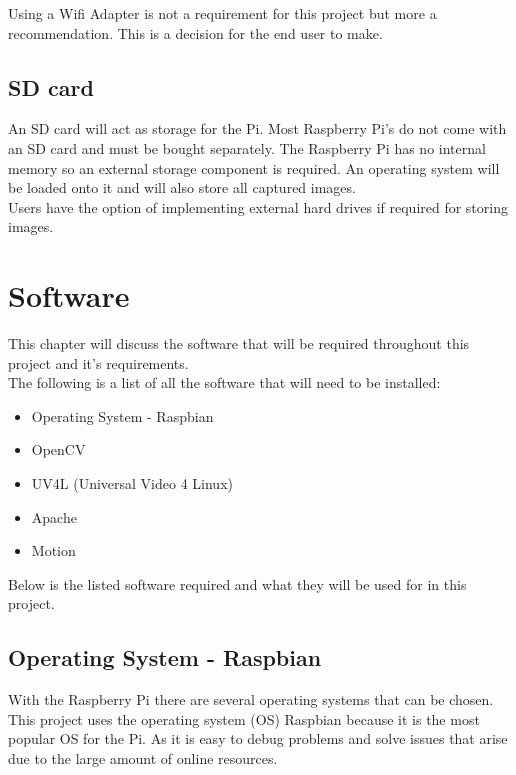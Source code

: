 \documentclass[12pt]{report}
\begin{document}
Using a Wifi Adapter is not a requirement for this project but  more a recommendation. This is a decision for the end user to make.\\

\noindent
\subsection{SD card}
\label{subsec:sdcard}
An SD card will act as storage for the Pi. Most Raspberry Pi's do not come with an SD card and must be bought separately. The Raspberry Pi has no internal memory so an external storage component is required. An operating system will be loaded onto it and will also store all captured images.\\

Users have the option of implementing external hard drives if required for storing images.\\



\clearpage
\section{Software}	
\label{sec:software}	
This chapter will discuss the software that will be required throughout this project and it's requirements.\\

The following is a list of all the software that will need to be installed:\\
\begin{itemize}
  \item Operating System - Raspbian \\
  \item OpenCV\\
  \item UV4L (Universal Video 4 Linux)\\  
  \item Apache\\
  \item Motion\\
\end{itemize}

Below is the listed software required and what they will be used for in this project.

\noindent
\subsection{Operating System - Raspbian}
\label{subsec:raspbian}
With the Raspberry Pi there are several operating systems that can be chosen. This project uses the operating system (OS) Raspbian because it is the most popular OS for the Pi. As it is easy to debug problems and solve issues that arise due to the large amount of online resources.\\
\end{document}
